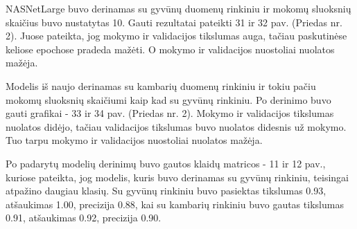 \documentclass{VUMIFPSbakalaurinis}
\begin{document}
NASNetLarge buvo derinamas su gyvūnų duomenų rinkiniu ir mokomų sluoksnių skaičius buvo nustatytas 10.
Gauti rezultatai pateikti 31 ir 32 pav. (Priedas nr. 2). Juose pateikta, jog mokymo ir validacijos tikslumas auga, tačiau paskutinėse keliose epochose pradeda mažėti. O mokymo ir validacijos nuostoliai nuolatos mažėja.

Modelis iš naujo derinamas su kambarių duomenų rinkiniu ir tokiu pačiu mokomų sluoksnių skaičiumi kaip kad su gyvūnų rinkiniu.
Po derinimo buvo gauti grafikai - 33 ir 34 pav. (Priedas nr. 2). Mokymo ir validacijos tikslumas nuolatos didėjo, tačiau validacijos tikslumas buvo nuolatos didesnis už mokymo. Tuo tarpu mokymo ir validacijos nuostoliai nuolatos mažėja.

Po padarytų modelių derinimų buvo gautos klaidų matricos - 11 ir 12 pav., kuriose pateikta, jog modelis, kuris buvo derinamas su gyvūnų rinkiniu, teisingai atpažino daugiau klasių.
Su gyvūnų rinkiniu buvo pasiektas tikslumas 0.93, atšaukimas 1.00, precizija 0.88, kai su kambarių rinkiniu buvo gautas tikslumas 0.91, atšaukimas 0.92, precizija 0.90.
\end{document}
